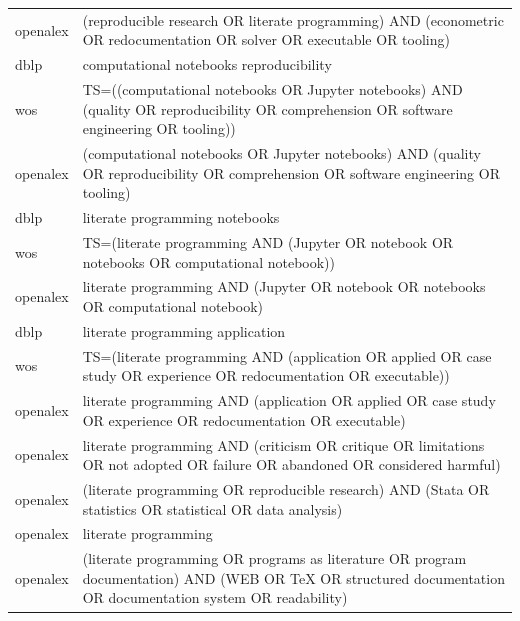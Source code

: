 \documentclass{article}
\begin{document}
\begin{longtable}{lp{10cm}}
openalex & (\textquotedbl{}reproducible research\textquotedbl{} OR \textquotedbl{}literate programming\textquotedbl{}) AND (econometric OR redocumentation OR solver OR executable OR tooling) \\
dblp & computational notebooks reproducibility \\
wos & TS=((\textquotedbl{}computational notebooks\textquotedbl{} OR \textquotedbl{}Jupyter notebooks\textquotedbl{}) AND (quality OR reproducibility OR comprehension OR \textquotedbl{}software engineering\textquotedbl{} OR tooling)) \\
openalex & (\textquotedbl{}computational notebooks\textquotedbl{} OR \textquotedbl{}Jupyter notebooks\textquotedbl{}) AND (quality OR reproducibility OR comprehension OR \textquotedbl{}software engineering\textquotedbl{} OR tooling) \\
dblp & literate programming notebooks \\
wos & TS=(\textquotedbl{}literate programming\textquotedbl{} AND (Jupyter OR notebook OR notebooks OR \textquotedbl{}computational notebook\textquotedbl{})) \\
openalex & \textquotedbl{}literate programming\textquotedbl{} AND (Jupyter OR notebook OR notebooks OR \textquotedbl{}computational notebook\textquotedbl{}) \\
dblp & literate programming application \\
wos & TS=(\textquotedbl{}literate programming\textquotedbl{} AND (application OR applied OR \textquotedbl{}case study\textquotedbl{} OR experience OR redocumentation OR executable)) \\
openalex & \textquotedbl{}literate programming\textquotedbl{} AND (application OR applied OR \textquotedbl{}case study\textquotedbl{} OR experience OR redocumentation OR executable) \\
openalex & \textquotedbl{}literate programming\textquotedbl{} AND (criticism OR critique OR limitations OR \textquotedbl{}not adopted\textquotedbl{} OR failure OR abandoned OR \textquotedbl{}considered harmful\textquotedbl{}) \\
openalex & (\textquotedbl{}literate programming\textquotedbl{} OR \textquotedbl{}reproducible research\textquotedbl{}) AND (Stata OR statistics OR statistical OR \textquotedbl{}data analysis\textquotedbl{}) \\
openalex & \textquotedbl{}literate programming\textquotedbl{} \\
openalex & (\textquotedbl{}literate programming\textquotedbl{} OR \textquotedbl{}programs as literature\textquotedbl{} OR \textquotedbl{}program documentation\textquotedbl{}) AND (WEB OR TeX OR \textquotedbl{}structured documentation\textquotedbl{} OR \textquotedbl{}documentation system\textquotedbl{} OR readability) \\

\end{longtable}
\end{document}
